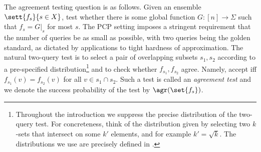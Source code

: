 \documentclass{article}[11pt]
\begin{document}
The agreement testing question is as follows. Given an ensemble $\sett{f_s}{s\in X}$, test whether there is some global function $G:[n]\to\Sigma$ such that $f_s = G|_s$ for most $s$.
The PCP setting imposes a stringent requirement that the number of queries be as small as possible, with two queries being the golden standard, as dictated by applications to tight hardness of approximation. 
The natural two-query test is to select a pair of overlapping subsets $s_1,s_2$ according to a pre-specified distribution\footnote{Throughout the introduction we suppress the precise distribution of the two-query test. For concreteness, think of the distribution given by selecting two $k$-sets that intersect on some $k'$ elements, and for example $k'=\sqrt k$. The distributions we use are precisely defined in .} and to check whether $f_{s_1},f_{s_2}$ agree. Namely, accept iff $f_{s_1}(v) = f_{s_2}(v)$ for all $v\in s_1\cap s_2$. Such a test is called an \emph{agreement test} and we denote the success probability of the test by $\agr(\set{f_s})$. 
\end{document}
